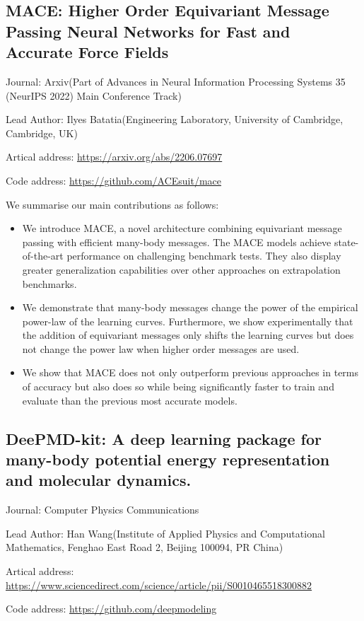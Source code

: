 \documentclass[11pt]{elegantbook}
\begin{document}
\subsection{MACE: Higher Order Equivariant Message Passing Neural Networks for Fast and Accurate Force Fields}
\begin{brief}
    \item Journal: Arxiv(Part of Advances in Neural Information Processing Systems 35 (NeurIPS 2022) Main Conference Track)
    \item Lead Author: Ilyes Batatia(Engineering Laboratory, University of Cambridge, Cambridge, UK)
    \item Artical address: \href{https://arxiv.org/abs/2206.07697}{https://arxiv.org/abs/2206.07697}
    \item Code address: \href{https://github.com/ACEsuit/mace}{https://github.com/ACEsuit/mace}
\end{brief}
We summarise our main contributions as follows:
\begin{itemize}
    \item We introduce MACE, a novel architecture combining equivariant message passing with efficient many-body messages. The MACE models achieve state-of-the-art performance on challenging benchmark tests. They also display greater generalization capabilities over other approaches on extrapolation benchmarks.
    \item We demonstrate that many-body messages change the power of the empirical power-law of the learning curves. Furthermore, we show experimentally that the addition of equivariant messages only shifts the learning curves but does not change the power law when higher order messages are used.
    \item We show that MACE does not only outperform previous approaches in terms of accuracy but also does so while being significantly faster to train and evaluate than the previous most accurate models.
\end{itemize}

\subsection{DeePMD-kit: A deep learning package for many-body potential energy representation and molecular dynamics.}
\begin{brief}
    \item Journal: Computer Physics Communications 
    \item Lead Author: Han Wang(Institute of Applied Physics and Computational Mathematics, Fenghao East Road 2, Beijing 100094, PR China)
    \item Artical address: \href{https://www.sciencedirect.com/science/article/pii/S0010465518300882}{https://www.sciencedirect.com/science/article/pii/S0010465518300882}
    \item Code address: \href{https://github.com/deepmodeling}{https://github.com/deepmodeling}
\end{brief}
\end{document}
